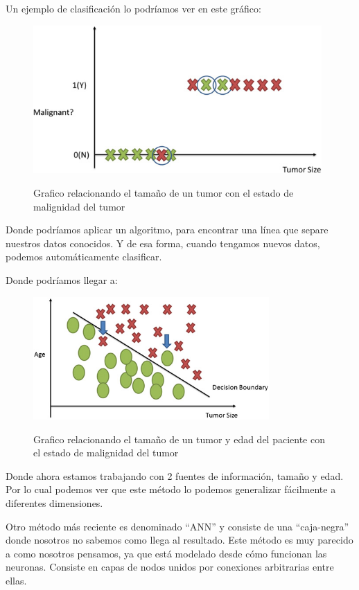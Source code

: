 \documentclass[12pt, letterpaper]{article}
\begin{document}
\noindent
Un ejemplo de clasificación lo podríamos ver en este gráfico:

\begin{figure}[h]
\centering
	\includegraphics[width=11cm]{1d-classification-kourouMachineLearningApplications2015.png}
	\label{fig: 1d-classification}
	\caption{Grafico relacionando el tamaño de un tumor con el estado de malignidad del tumor}
	\autocite{kourouMachineLearningApplications2015}
\end{figure}

Donde podríamos aplicar un algoritmo, para encontrar una línea que separe nuestros datos conocidos. Y de esa forma, cuando tengamos nuevos datos, podemos automáticamente clasificar.

\pagebreak

\noindent
Donde podríamos llegar a:

\begin{figure}[h]
\centering
	\includegraphics[width=9cm]{2d-classification-kourouMachineLearningApplications2015.png}
	\label{fig: 2d-classification}
	\caption{Grafico relacionando el tamaño de un tumor y edad del paciente con el estado de malignidad del tumor}
	\autocite{kourouMachineLearningApplications2015}
\end{figure}


Donde ahora estamos trabajando con 2 fuentes de información, tamaño y edad. Por lo cual podemos ver que este método lo podemos generalizar fácilmente a diferentes dimensiones.

Otro método más reciente es denominado \enquote{ANN} y consiste de una \enquote{caja-negra} donde nosotros no sabemos como llega al resultado. Este método es muy parecido a como nosotros pensamos, ya que está modelado desde cómo funcionan las neuronas. Consiste en capas de nodos unidos por conexiones arbitrarias entre ellas. 
\end{document}
